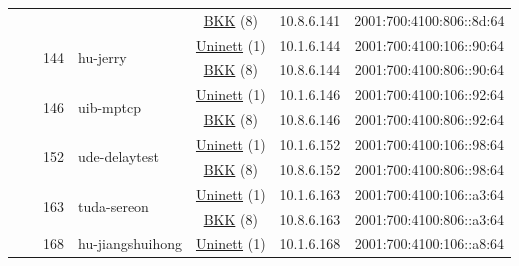 \begin{small}
\begin{center}
\begin{longtable}{|c|c|c|c|c|c|c|c|}
  &  &  &  & \multicolumn{2}{|c|}{\tiny{\href{http://bkk.no}{BKK} (8)}} & \tiny{10.8.6.141} & \tiny{2001:700:4100:806::8d:64} \\* \cline{3-3}\cline{4-4}\cline{5-5}\cline{6-6}\cline{7-7}\cline{8-8}
  &  & \multirow{2}{*}{\tiny{144}} & \multicolumn{1}{|l|}{\multirow{2}{*}{\tiny{hu-jerry}}} & \multicolumn{2}{|c|}{\tiny{\href{https://www.uninett.no}{Uninett} (1)}} & \tiny{10.1.6.144} & \tiny{2001:700:4100:106::90:64} \\* \cline{5-5}\cline{6-6}\cline{7-7}\cline{8-8}
  &  &  &  & \multicolumn{2}{|c|}{\tiny{\href{http://bkk.no}{BKK} (8)}} & \tiny{10.8.6.144} & \tiny{2001:700:4100:806::90:64} \\* \cline{3-3}\cline{4-4}\cline{5-5}\cline{6-6}\cline{7-7}\cline{8-8}
  &  & \multirow{2}{*}{\tiny{146}} & \multicolumn{1}{|l|}{\multirow{2}{*}{\tiny{uib-mptcp}}} & \multicolumn{2}{|c|}{\tiny{\href{https://www.uninett.no}{Uninett} (1)}} & \tiny{10.1.6.146} & \tiny{2001:700:4100:106::92:64} \\* \cline{5-5}\cline{6-6}\cline{7-7}\cline{8-8}
  &  &  &  & \multicolumn{2}{|c|}{\tiny{\href{http://bkk.no}{BKK} (8)}} & \tiny{10.8.6.146} & \tiny{2001:700:4100:806::92:64} \\* \cline{3-3}\cline{4-4}\cline{5-5}\cline{6-6}\cline{7-7}\cline{8-8}
  &  & \multirow{2}{*}{\tiny{152}} & \multicolumn{1}{|l|}{\multirow{2}{*}{\tiny{ude-delaytest}}} & \multicolumn{2}{|c|}{\tiny{\href{https://www.uninett.no}{Uninett} (1)}} & \tiny{10.1.6.152} & \tiny{2001:700:4100:106::98:64} \\* \cline{5-5}\cline{6-6}\cline{7-7}\cline{8-8}
  &  &  &  & \multicolumn{2}{|c|}{\tiny{\href{http://bkk.no}{BKK} (8)}} & \tiny{10.8.6.152} & \tiny{2001:700:4100:806::98:64} \\* \cline{3-3}\cline{4-4}\cline{5-5}\cline{6-6}\cline{7-7}\cline{8-8}
  &  & \multirow{2}{*}{\tiny{163}} & \multicolumn{1}{|l|}{\multirow{2}{*}{\tiny{tuda-sereon}}} & \multicolumn{2}{|c|}{\tiny{\href{https://www.uninett.no}{Uninett} (1)}} & \tiny{10.1.6.163} & \tiny{2001:700:4100:106::a3:64} \\* \cline{5-5}\cline{6-6}\cline{7-7}\cline{8-8}
  &  &  &  & \multicolumn{2}{|c|}{\tiny{\href{http://bkk.no}{BKK} (8)}} & \tiny{10.8.6.163} & \tiny{2001:700:4100:806::a3:64} \\* \cline{3-3}\cline{4-4}\cline{5-5}\cline{6-6}\cline{7-7}\cline{8-8}
  &  & \multirow{2}{*}{\tiny{168}} & \multicolumn{1}{|l|}{\multirow{2}{*}{\tiny{hu-jiangshuihong}}} & \multicolumn{2}{|c|}{\tiny{\href{https://www.uninett.no}{Uninett} (1)}} & \tiny{10.1.6.168} & \tiny{2001:700:4100:106::a8:64} \\* \cline{5-5}\cline{6-6}\cline{7-7}\cline{8-8}

\end{longtable}
\end{center}
\end{small}
